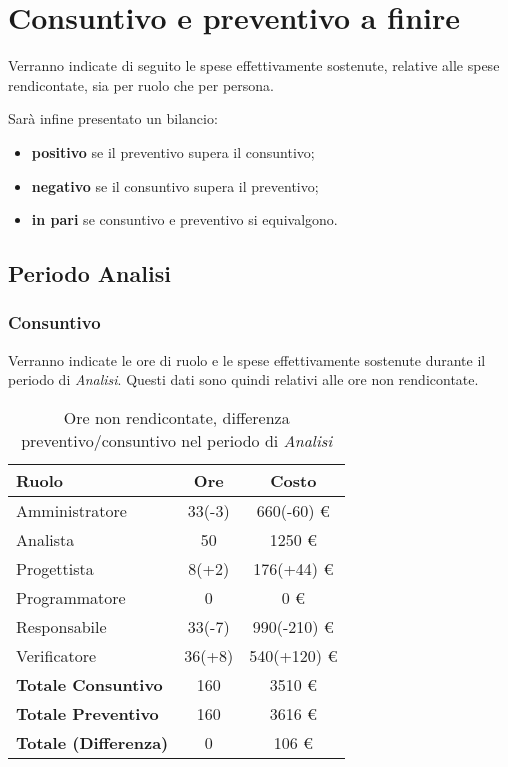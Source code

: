 \section{Consuntivo e preventivo a finire}
Verranno indicate di seguito le spese effettivamente sostenute, relative alle spese rendicontate, sia per ruolo che per persona.

Sar\`a infine presentato un bilancio:
\begin{itemize}
\item \textbf{positivo} se il preventivo supera il consuntivo;
\item \textbf{negativo} se il consuntivo supera il preventivo;
\item \textbf{in pari} se consuntivo e preventivo si equivalgono.
\end{itemize}


\subsection{Periodo Analisi}
\subsubsection{Consuntivo}
Verranno indicate le ore di ruolo e le spese effettivamente sostenute durante il periodo di \textit{Analisi}. Questi dati sono quindi relativi alle ore non rendicontate.

\begin{table}[H]
	\centering
	\begin{tabular}{ l c c }
		\textbf{Ruolo} & \textbf{Ore} & \textbf{Costo} \\
		\hline
		Amministratore & 33(-3) & 660(-60) \euro{} \\
		Analista & 50 & 1250 \euro{} \\
		Progettista & 8(+2) & 176(+44) \euro{} \\
		Programmatore & 0 & 0 \euro{} \\
		Responsabile & 33(-7) & 990(-210) \euro{} \\
		Verificatore & 36(+8) & 540(+120) \euro{} \\
		\hline
		\textbf{Totale Consuntivo} & 160 & 3510 \euro{} \\
		\hline
		\textbf{Totale Preventivo} & 160 & 3616 \euro{} \\
		\hline
		\textbf{Totale (Differenza)} & 0 & 106 \euro{} \\
		\hline
	\end{tabular}
	\caption{Ore non rendicontate, differenza preventivo/consuntivo nel periodo di \textit{Analisi}}
\end{table}



